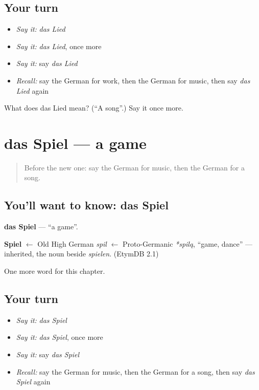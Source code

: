 \subsection*{Your turn}
\begin{itemize}
\raggedright
  \item \emph{Say it:} \emph{das Lied}
  \item \emph{Say it:} \emph{das Lied}, once more
  \item \emph{Say it:} say \emph{das Lied}
  \item \emph{Recall:} say the German for work, then the German for music, then say \emph{das Lied} again
\end{itemize}

\begin{tcolorbox}[breakable,colback=teal!4,colframe=teal!35!black,title={Before you move on}]
What does das Lied mean? (\textquotedblleft{}A song\textquotedblright{}.) Say it once more.
\end{tcolorbox}
\section[das Spiel]{das Spiel — a game}

\label{lesson:GE-C103-spiel}



\begin{quote}
Before the new one: say the German for music, then the German for a song.
\end{quote}

\subsection*{You'll want to know: das Spiel}
\textbf{das Spiel} — \textquotedblleft{}a game\textquotedblright{}.

\begin{cousinweb}
\textbf{Spiel} $\leftarrow$ Old High German \emph{spil} $\leftarrow$ Proto-Germanic \emph{*spilą}, \textquotedblleft{}game, dance\textquotedblright{} — inherited, the noun beside \emph{spielen}. (EtymDB 2.1)
\end{cousinweb}

\begin{grammarlens}[title={What you've built}]
One more word for this chapter.
\end{grammarlens}

\subsection*{Your turn}
\begin{itemize}
\raggedright
  \item \emph{Say it:} \emph{das Spiel}
  \item \emph{Say it:} \emph{das Spiel}, once more
  \item \emph{Say it:} say \emph{das Spiel}
  \item \emph{Recall:} say the German for music, then the German for a song, then say \emph{das Spiel} again
\end{itemize}

